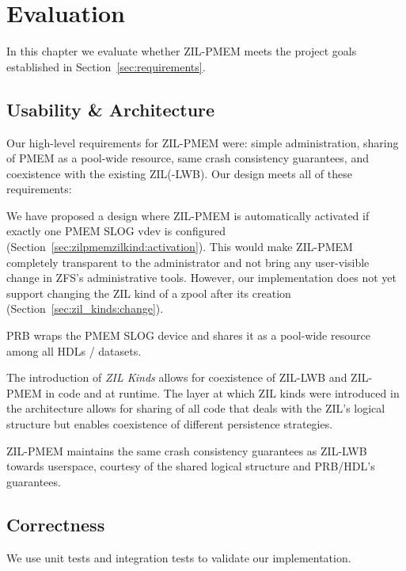 \documentclass[12pt,a4paper,twoside]{book}
\begin{document}
\chapter{Evaluation}\label{ch:eval}
In this chapter we evaluate whether ZIL-PMEM meets the project goals established in Section~\ref{sec:requirements}.

\section{Usability \& Architecture}

Our high-level requirements for ZIL-PMEM were: simple administration, sharing of PMEM as a pool-wide resource, same crash consistency guarantees, and coexistence with the existing ZIL(-LWB).
Our design meets all of these requirements:
\begin{description}[noitemsep]
    \item[Simple Administration] We have proposed a design where ZIL-PMEM is automatically activated if exactly one PMEM SLOG vdev is configured (Section~\ref{sec:zilpmemzilkind:activation}).
        This would make ZIL-PMEM completely transparent to the administrator and not bring any user-visible change in ZFS's administrative tools.
        However, our implementation does not yet support changing the ZIL kind of a zpool after its creation (Section~\ref{sec:zil_kinds:change}).
    \item[Pooled Storage] PRB wraps the PMEM SLOG device and shares it as a pool-wide resource among all HDLs / datasets.
    \item[Coexistence] The introduction of \textit{ZIL Kinds} allows for coexistence of ZIL-LWB and ZIL-PMEM in code and at runtime.
        The layer at which ZIL kinds were introduced in the architecture allows for sharing of all code that deals with the ZIL's logical structure but enables coexistence of different persistence strategies.
    \item[Same Guarantees] ZIL-PMEM maintains the same crash consistency guarantees as ZIL-LWB towards userspace, courtesy of the shared logical structure and PRB/HDL's guarantees.
\end{description}

\section{Correctness}

We use unit tests and integration tests to validate our implementation.
\end{document}
